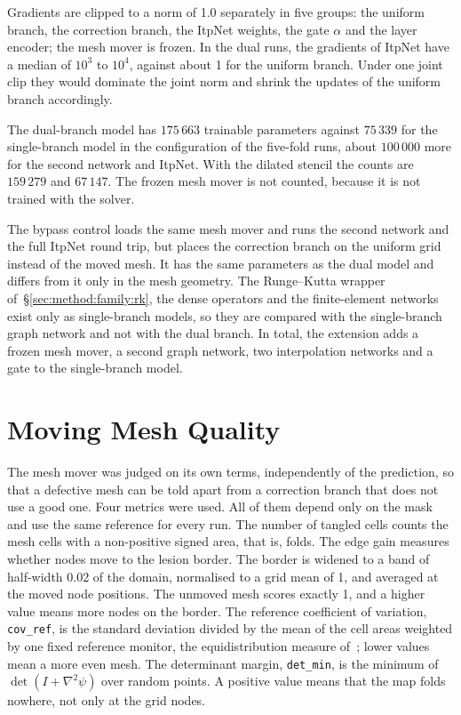 Gradients are clipped to a norm of 1.0 separately in five groups: the
uniform branch, the correction branch, the ItpNet weights, the gate
$\alpha$ and the layer encoder; the mesh mover is frozen. In the dual runs,
the gradients of ItpNet have a median of $10^3$ to $10^4$, against about 1
for the uniform branch. Under one joint clip they would dominate the joint
norm and shrink the updates of the uniform branch accordingly.

The dual-branch model has $175\,663$ trainable parameters against
$75\,339$ for the single-branch model in the configuration of the
five-fold runs, about $100\,000$ more for the second network and ItpNet.
With the dilated stencil the counts are $159\,279$ and $67\,147$. The
frozen mesh mover is not counted, because it is not trained with the
solver.

The bypass control loads the same mesh mover and runs the second network
and the full ItpNet round trip, but places the correction branch on the
uniform grid instead of the moved mesh. It has the same parameters as the
dual model and differs from it only in the mesh geometry. The
Runge--Kutta wrapper of~\S\ref{sec:method:family:rk}, the dense operators
and the finite-element networks exist only as single-branch models, so
they are compared with the single-branch graph network and not with the
dual branch. In total, the extension adds a frozen mesh mover, a second
graph network, two interpolation networks and a gate to the
single-branch model.

\section{Moving Mesh Quality}
\label{app:mm-pde:mesh-quality}

The mesh mover was judged on its own terms, independently of the
prediction, so that a defective mesh can be told apart from a correction
branch that does not use a good one. Four metrics were used. All of them
depend only on the mask and use the same reference for every run. The
number of tangled cells counts the mesh cells with a non-positive signed
area, that is, folds. The edge gain measures whether nodes move to the
lesion border. The border is widened to a band of half-width 0.02 of the
domain, normalised to a grid mean of 1, and averaged at the moved node
positions. The unmoved mesh scores exactly 1, and a higher value means more
nodes on the border. The reference coefficient of variation,
\texttt{cov\_ref}, is the standard deviation divided by the mean of the
cell areas weighted by one fixed reference monitor, the equidistribution
measure of~\citet{HuangRussell2011}; lower values mean a more even mesh.
The determinant margin, \texttt{det\_min}, is the minimum of
$\det(I + \nabla^2\psi)$ over random points. A positive value means that
the map folds nowhere, not only at the grid nodes.

